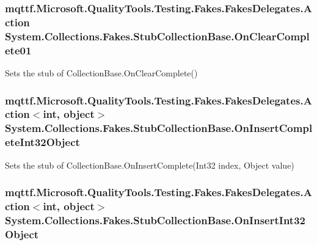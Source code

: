 \hypertarget{class_system_1_1_collections_1_1_fakes_1_1_stub_collection_base_a66459f7cca596c6734b52c61be5b25e1}{
\subsubsection[{On\-Clear\-Complete01}]{\setlength{\rightskip}{0pt plus 5cm}mqttf.\-Microsoft.\-Quality\-Tools.\-Testing.\-Fakes.\-Fakes\-Delegates.\-Action System.\-Collections.\-Fakes.\-Stub\-Collection\-Base.\-On\-Clear\-Complete01}}\label{class_system_1_1_collections_1_1_fakes_1_1_stub_collection_base_a66459f7cca596c6734b52c61be5b25e1}


Sets the stub of Collection\-Base.\-On\-Clear\-Complete()

\hypertarget{class_system_1_1_collections_1_1_fakes_1_1_stub_collection_base_ae86100db23b7d9b5c91781c40d052c9e}{
\subsubsection[{On\-Insert\-Complete\-Int32\-Object}]{\setlength{\rightskip}{0pt plus 5cm}mqttf.\-Microsoft.\-Quality\-Tools.\-Testing.\-Fakes.\-Fakes\-Delegates.\-Action$<$int, object$>$ System.\-Collections.\-Fakes.\-Stub\-Collection\-Base.\-On\-Insert\-Complete\-Int32\-Object}}\label{class_system_1_1_collections_1_1_fakes_1_1_stub_collection_base_ae86100db23b7d9b5c91781c40d052c9e}


Sets the stub of Collection\-Base.\-On\-Insert\-Complete(\-Int32 index, Object value)

\hypertarget{class_system_1_1_collections_1_1_fakes_1_1_stub_collection_base_a04761db766ec3917772493a2b3dc788f}{
\subsubsection[{On\-Insert\-Int32\-Object}]{\setlength{\rightskip}{0pt plus 5cm}mqttf.\-Microsoft.\-Quality\-Tools.\-Testing.\-Fakes.\-Fakes\-Delegates.\-Action$<$int, object$>$ System.\-Collections.\-Fakes.\-Stub\-Collection\-Base.\-On\-Insert\-Int32\-Object}}\label{class_system_1_1_collections_1_1_fakes_1_1_stub_collection_base_a04761db766ec3917772493a2b3dc788f}


